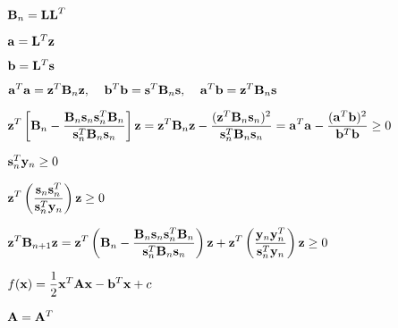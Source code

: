 \documentclass{article}
\def\lthtmlcheckvsize{\ifdim\ht\sizebox<\vsize 
  \ifdim\wd\sizebox<\hsize\expandafter\hfill\fi \expandafter\vfill
  \else\expandafter\vss\fi}%
\begin{document}
{\newpage\clearpage
{}%
$ {\bf B}_n={\bf LL}^T$%
\lthtmlindisplaymathZ
\lthtmlcheckvsize\clearpage}

{\newpage\clearpage
{}%
$ {\bf a}={\bf L}^T{\bf z}$%
\lthtmlindisplaymathZ
\lthtmlcheckvsize\clearpage}

{\newpage\clearpage
{}%
$ {\bf b}={\bf L}^T{\bf s}$%
\lthtmlindisplaymathZ
\lthtmlcheckvsize\clearpage}

{\newpage\clearpage
{}%
$\displaystyle {\bf a}^T{\bf a}={\bf z}^T{\bf B}_n{\bf z},\;\;\;\;
{\bf b}^T{\bf b}={\bf s}^T{\bf B}_n{\bf s},\;\;\;\;
{\bf a}^T{\bf b}={\bf z}^T{\bf B}_n{\bf s}$%
\lthtmlindisplaymathZ
\lthtmlcheckvsize\clearpage}

{\newpage\clearpage
{}%
$\displaystyle {\bf z}^T\left[ {\bf B}_n-\frac{{\bf B}_n{\bf s}_n{\bf s}_n^T{\bf B}_n}{{\bf s}_n^T{\bf B}_n{\bf s}_n}\right] {\bf z}
={\bf z}^T{\bf B}_n{\bf z}
-\frac{({\bf z}^T{\bf B}_n{\bf s}_n)^2}{{\bf s}_n^T{\bf B}_n{\bf s}_n}
={\bf a}^T{\bf a}-\frac{({\bf a}^T{\bf b})^2}{{\bf b}^T{\bf b}}\ge 0$%
\lthtmlindisplaymathZ
\lthtmlcheckvsize\clearpage}

{\newpage\clearpage
{}%
$ {\bf s}_n^T{\bf y}_n\ge 0$%
\lthtmlindisplaymathZ
\lthtmlcheckvsize\clearpage}

{\newpage\clearpage
{}%
$\displaystyle {\bf z}^T\left(\frac{{\bf s}_n{\bf s}_n^T}{{\bf s}_n^T{\bf y}_n}\right){\bf z}\ge 0$%
\lthtmlindisplaymathZ
\lthtmlcheckvsize\clearpage}

{\newpage\clearpage
{}%
$\displaystyle {\bf z}^T{\bf B}_{n+1}{\bf z}
=  {\bf z}^T\left( {\bf B}_n-\frac{{\bf B}_n{\bf s}_n{\bf s}_n^T{\bf B}_n}{{\bf s}_n^T{\bf B}_n{\bf s}_n}\right) {\bf z}
+{\bf z}^T\left(\frac{{\bf y}_n{\bf y}_n^T}{{\bf s}_n^T{\bf y}_n}\right){\bf z}\ge 0$%
\lthtmlindisplaymathZ
\lthtmlcheckvsize\clearpage}

{\newpage\clearpage
{}%
$\displaystyle f({\bf x})=\frac{1}{2}{\bf x}^T{\bf A}{\bf x}-{\bf b}^T{\bf x}+c$%
\lthtmlindisplaymathZ
\lthtmlcheckvsize\clearpage}

{\newpage\clearpage
{}%
$ {\bf A}={\bf A}^T$%
\lthtmlindisplaymathZ
\lthtmlcheckvsize\clearpage}
\end{document}
